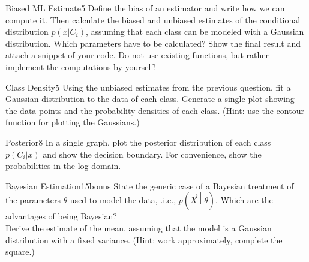 \begin{questions}

\begin{question}{Biased ML Estimate}{5}
Define the bias of an estimator and write how we can compute it.
Then calculate the biased and unbiased estimates of the conditional distribution $p(x|C_i)$, assuming that each class can be modeled with a Gaussian distribution. Which parameters have to be calculated?
Show the final result and attach a snippet of your code.
Do not use existing functions, but rather implement the computations by yourself!

\begin{answer}

\end{answer}

\end{question}



\begin{question}{Class Density}{5}
Using the unbiased estimates from the previous question, fit a Gaussian distribution to the data of each class. Generate a single plot showing the data points and the probability densities of each class.
(Hint: use the contour function for plotting the Gaussians.) 

\begin{answer}

\end{answer}

\end{question}


\begin{question}{Posterior}{8}
In a single graph, plot the posterior distribution of each class $p(C_i|x)$ 
and show the decision boundary. For convenience, show the probabilities
in the log domain.

\begin{answer}

\end{answer}

\end{question}


\begin{question}{Bayesian Estimation}{15}{bonus}
State the generic case of a Bayesian treatment of the parameters $\theta$ used to model the data, .i.e., $p(\vec X \middle | \theta )$. 
Which are the advantages of being Bayesian? 
\\ Derive the estimate of the mean, assuming that the model is a Gaussian distribution with a fixed variance. (Hint: work approximately, complete the square.)


\begin{answer}
\end{answer}

\end{question}

\end{questions}
